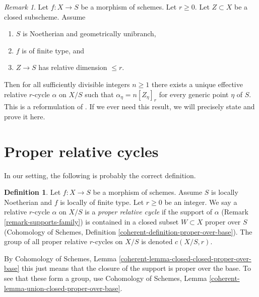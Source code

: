 \documentclass{stacks-project}
\theoremstyle{plain}
\theoremstyle{definition}
\newtheorem{definition}[subsection]{Definition}
\theoremstyle{remark}
\newtheorem{remark}[subsection]{Remark}
\numberwithin{equation}{subsection}
\begin{document}
\begin{remark}
\label{remark-equidimensional-over-geometrically-unibranch}
Let $f : X \to S$ be a morphism of schemes. Let $r \geq 0$. Let $Z \subset X$
be a closed subscheme. Assume
\begin{enumerate}
\item $S$ is Noetherian and geometrically unibranch,
\item $f$ is of finite type, and
\item $Z \to S$ has relative dimension $\leq r$.
\end{enumerate}
Then for all sufficiently divisible integers $n \geq 1$ there exists a
unique effective relative $r$-cycle $\alpha$ on $X/S$ such that
$\alpha_\eta = n[Z_\eta]_r$ for every generic point $\eta$ of $S$.
This is a reformulation of \cite[Theorem 3.4.2]{SV}.
If we ever need this result, we will precisely state and prove it here.
\end{remark}











\section{Proper relative cycles}
\label{section-proper}

\noindent
In our setting, the following is probably the correct definition.

\begin{definition}
\label{definition-proper}
Let $f : X \to S$ be a morphism of schemes. Assume $S$ is locally Noetherian
and $f$ is locally of finite type. Let $r \geq 0$ be an integer. We say a
relative $r$-cycle $\alpha$ on $X/S$ is a {\it proper relative cycle}
if the support of $\alpha$ (Remark \ref{remark-supports-family})
is contained in a closed subset $W \subset X$ proper over $S$
(Cohomology of Schemes, Definition \ref{coherent-definition-proper-over-base}).
The group of all proper relative $r$-cycles on $X/S$ is
denoted $c(X/S, r)$.
\end{definition}

\noindent
By Cohomology of Schemes, Lemma
\ref{coherent-lemma-closed-closed-proper-over-base}
this just means that the closure of the support is proper over the base.
To see that these form a group, use
Cohomology of Schemes, Lemma \ref{coherent-lemma-union-closed-proper-over-base}.
\end{document}
